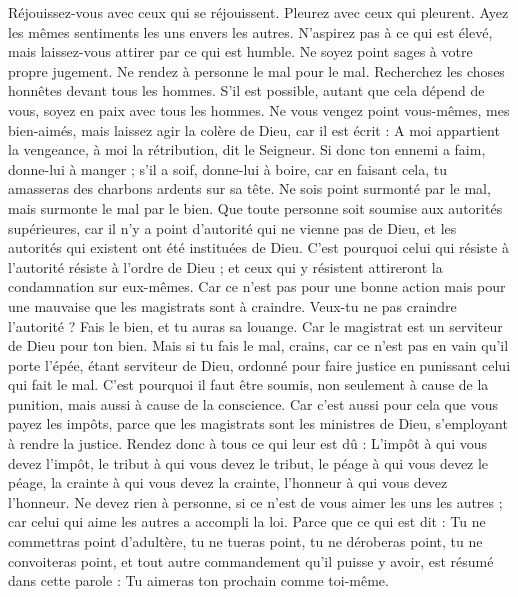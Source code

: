 \begin{multicols}{2}
Réjouissez-vous avec ceux qui se réjouissent. Pleurez avec ceux qui pleurent.
Ayez les mêmes sentiments les uns envers les autres. N'aspirez pas à ce qui est élevé, mais laissez-vous attirer par ce qui est humble. Ne soyez point sages à votre propre jugement.
Ne rendez à personne le mal pour le mal. Recherchez les choses honnêtes devant tous les hommes.
S'il est possible, autant que cela dépend de vous, soyez en paix avec tous les hommes.
Ne vous vengez point vous-mêmes, mes bien-aimés, mais laissez agir la colère de Dieu, car il est écrit : A moi appartient la vengeance, à moi la rétribution, dit le Seigneur.
Si donc ton ennemi a faim, donne-lui à manger ; s'il a soif, donne-lui à boire, car en faisant cela, tu amasseras des charbons ardents sur sa tête.
Ne sois point surmonté par le mal, mais surmonte le mal par le bien.
\VerseOne{}Que toute personne soit soumise aux autorités supérieures, car il n'y a point d'autorité qui ne vienne pas de Dieu, et les autorités qui existent ont été instituées de Dieu.
C'est pourquoi celui qui résiste à l'autorité résiste à l'ordre de Dieu ; et ceux qui y résistent attireront la condamnation sur eux-mêmes.
Car ce n'est pas pour une bonne action mais pour une mauvaise que les magistrats sont à craindre. Veux-tu ne pas craindre l'autorité ? Fais le bien, et tu auras sa louange.
Car le magistrat est un serviteur de Dieu pour ton bien. Mais si tu fais le mal, crains, car ce n'est pas en vain qu'il porte l'épée, étant serviteur de Dieu, ordonné pour faire justice en punissant celui qui fait le mal.
C'est pourquoi il faut être soumis, non seulement à cause de la punition, mais aussi à cause de la conscience.
Car c'est aussi pour cela que vous payez les impôts, parce que les magistrats sont les ministres de Dieu, s'employant à rendre la justice.
Rendez donc à tous ce qui leur est dû : L'impôt à qui vous devez l'impôt, le tribut à qui vous devez le tribut, le péage à qui vous devez le péage, la crainte à qui vous devez la crainte, l'honneur à qui vous devez l'honneur.
Ne devez rien à personne, si ce n'est de vous aimer les uns les autres ; car celui qui aime les autres a accompli la loi.
Parce que ce qui est dit : Tu ne commettras point d'adultère, tu ne tueras point, tu ne déroberas point, tu ne convoiteras point, et tout autre commandement qu'il puisse y avoir, est résumé dans cette parole : Tu aimeras ton prochain comme toi-même.

\end{multicols}
